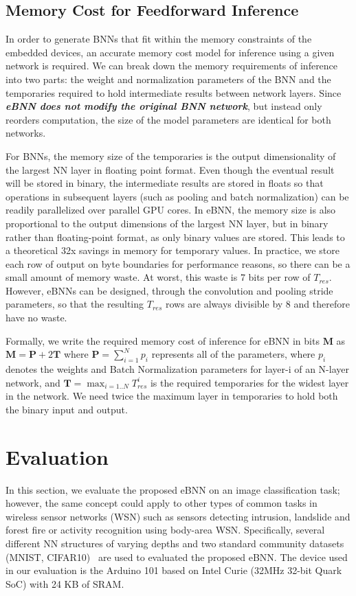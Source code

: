 \documentclass[10pt,emptycopyrightspace]{ewsn-proc}
\begin{document}
\subsection{Memory Cost for Feedforward Inference}
In order to generate BNNs that fit within the memory constraints of the embedded devices, an accurate memory cost model for inference using a given network is required. We can break down the memory requirements of inference into two parts: the weight and normalization parameters of the BNN and the temporaries required to hold intermediate results between network layers. Since \textbf{\textit{eBNN does not modify the original BNN network}}, but instead only reorders computation, the size of the model parameters are identical for both networks.

For BNNs, the memory size of the temporaries is the output dimensionality of the largest NN layer in floating point format. Even though the eventual result will be stored in binary, the intermediate results are stored in floats so that operations in subsequent layers (such as pooling and batch normalization) can be readily parallelized over parallel GPU cores. In eBNN, the memory size is also proportional to the output dimensions of the largest NN layer, but in binary rather than floating-point format, as only binary values are stored. This leads to a theoretical 32x savings in memory for temporary values. In practice, we store each row of output on byte boundaries for performance reasons, so there can be a small amount of memory waste. At worst, this waste is 7 bits per row of $T_{res}$. However, eBNNs can be designed, through the convolution and pooling stride parameters, so that the resulting $T_{res}$ rows are always divisible by $8$ and therefore have no waste.

Formally, we write the required memory cost of inference for eBNN in bits $\textbf{M}$ as $\textbf{M} = \textbf{P} + 2\textbf{T}$ where $\textbf{P} = \sum_{i=1}^N p_i$ represents all of the parameters, where $p_i$ denotes the weights and Batch Normalization parameters for layer-i of an N-layer network, and $\textbf{T} = \max_{i=1..N} T_{res}^i$ is the required temporaries for the widest layer in the network. We need twice the maximum layer in temporaries to hold both the binary input and output.


\section{Evaluation}
\label{sec:eval}
In this section, we evaluate the proposed eBNN on an image classification task; however, the same concept could apply to other types of common tasks in wireless sensor networks (WSN) such as sensors detecting intrusion, landslide and forest fire or activity recognition using body-area WSN. Specifically, several different NN structures of varying depths and two standard community datasets (MNIST, CIFAR10)~\cite{lecun1998mnist,krizhevsky2009learning} are used to evaluated the proposed eBNN. The device used in our evaluation is the Arduino 101 based on Intel Curie (32MHz 32-bit Quark SoC) with 24 KB of SRAM.
\end{document}
